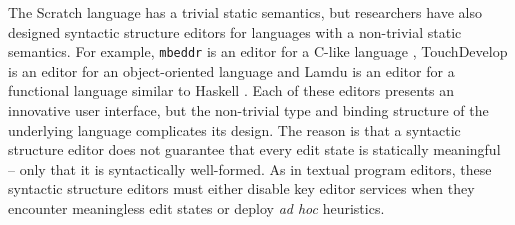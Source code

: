The Scratch language has a trivial static semantics, but researchers have also designed syntactic structure editors for  languages with a non-trivial static semantics. For example, \texttt{mbeddr} is an editor for a C-like language \cite{voelter_mbeddr:_2012}, TouchDevelop is an editor for an object-oriented language \cite{tillmann_touchdevelop:_2011} and Lamdu is an editor for a functional language similar to Haskell \cite{lamdu}. Each of these editors presents an innovative user interface, but the non-trivial type and binding structure of the underlying language complicates its design. The reason is that a syntactic structure editor does not guarantee that every edit state is statically meaningful -- only that it is syntactically well-formed. As in textual program editors, these syntactic structure editors must either disable key editor services when they encounter meaningless edit states or deploy \emph{ad hoc} heuristics.




